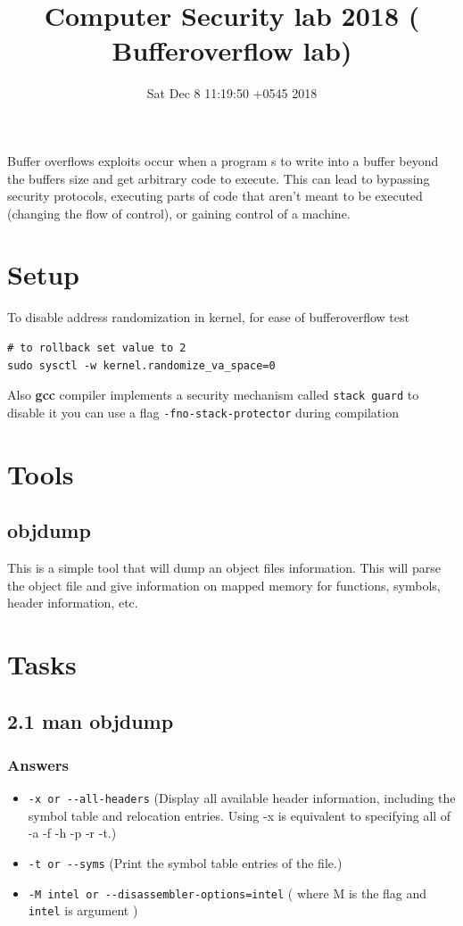 \documentclass[11pt]{article}
\date{Sat Dec  8 11:19:50 +0545 2018}
\title{Computer Security lab 2018 ( Bufferoverflow lab)}
\begin{document}
\maketitle
Buffer overflows exploits occur when a program s to write into a buffer beyond the buffers size and get arbitrary code to execute. This can lead to bypassing security protocols, executing parts of code that aren't meant to be executed (changing the flow of control), or gaining control of a machine.

\section*{Setup}
\label{sec:org015974e}
To disable address randomization in kernel, for ease of bufferoverflow test
\begin{verbatim}
# to rollback set value to 2
sudo sysctl -w kernel.randomize_va_space=0
\end{verbatim}
Also \textbf{gcc} compiler implements a security mechanism called \texttt{stack guard} to disable it you can use a flag \texttt{-fno-stack-protector} during compilation

\section*{Tools}
\label{sec:org25e1701}
\subsection*{objdump}
\label{sec:org3fc7df8}
This is a simple tool that will dump an object files information. This will parse the object file and give information on mapped memory for functions, symbols, header information, etc.

\section*{Tasks}
\label{sec:orgccbcd43}
\subsection*{2.1 man objdump}
\label{sec:org9840cf8}
\subsubsection*{Answers}
\label{sec:org8806435}
\begin{itemize}
\item \texttt{-x or -{}-all-headers} (Display all available header information, including the symbol table and relocation entries.  Using -x is equivalent to specifying all of -a -f -h -p -r -t.)
\item \texttt{-t or -{}-syms} (Print the symbol table entries of the file.)
\item \texttt{-M intel or -{}-disassembler-options=intel} ( where M is the flag and \texttt{intel} is argument )
\end{itemize}
\end{document}
